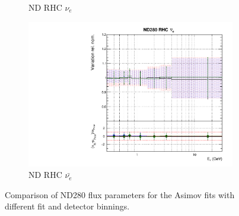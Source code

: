 \begin{figure}[!htbp]
\begin{subfigure}{0.45\textwidth}
  \caption{ND RHC $\nu_{e}$}
\end{subfigure}
\begin{subfigure}{0.45\textwidth}
  \centering
  \includegraphics[width=0.75\linewidth]{figs/polyasmvsflux_7}
  \caption{ND RHC $\bar{\nu_e}$}
\end{subfigure}
\caption{Comparison of ND280 flux parameters for the Asimov fits with different fit and detector binnings.}
\label{fig:polyasmvsfluxND}
\end{figure}

